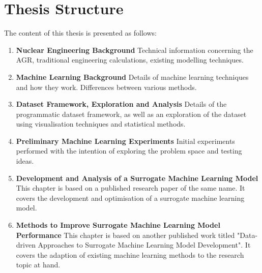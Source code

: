 \section{Thesis Structure}

The content of this thesis is presented as follows:

\begin{enumerate} 
	
	\item \textbf{Nuclear Engineering Background} Technical information concerning the AGR, traditional engineering calculations, existing modelling techniques. 
	
	\item \textbf{Machine Learning Background} Details of machine learning techniques and how they work. Differences between various methods.
	
	\item \textbf{Dataset Framework, Exploration and Analysis} Details of the programmatic dataset framework, as well as an exploration of the dataset using visualisation techniques and statistical methods.
	
	\item \textbf{Preliminary Machine Learning Experiments} Initial experiments performed with the intention of exploring the problem space and testing ideas. 
	
	\item \textbf{Development and Analysis of a Surrogate Machine Learning Model} This chapter is based on a published research paper of the same name. It covers the development and optimisation of a surrogate machine learning model. 
	
	\item \textbf{Methods to Improve Surrogate Machine Learning Model Performance} This chapter is based on another published work titled "Data-driven Approaches to Surrogate Machine Learning Model Development". It covers the adaption of existing machine learning methods to the research topic at hand.
		
\end{enumerate}
	
	


